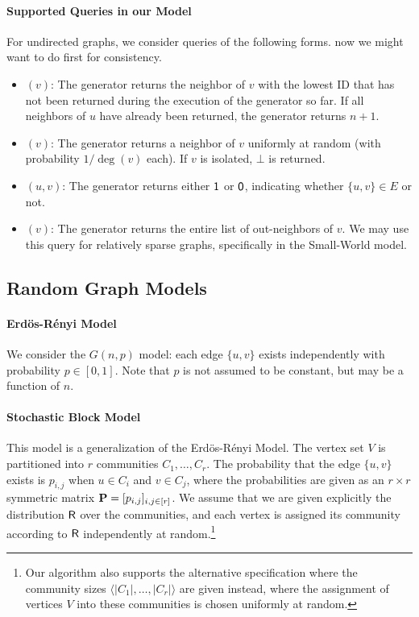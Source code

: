 \paragraph*{Supported Queries in our Model} 
For undirected graphs, we consider queries of the following forms.
now we might want to do  first for consistency.
\begin{itemize}
\item {}$(v)$: The generator returns the neighbor of $v$ with the lowest ID that has not been returned during the execution of the generator so far. If all neighbors of $u$ have already been returned, the generator returns $n+1$.
\item {}$(v)$: The generator returns a neighbor of $v$ uniformly at random (with probability $1/\deg(v)$ each). If $v$ is isolated, $\bot$ is returned.
\item {}$(u,v)$: The generator returns either $\mathsf{1}$ or $\mathsf{0}$, indicating whether $\{u,v\}\in E$ or not.
\item {}$(v)$: The generator returns the entire list of out-neighbors of $v$. We may use this query for relatively sparse graphs, specifically in the Small-World model.
\end{itemize}

\subsection{Random Graph Models}
\label{sec:graph_model}

\paragraph*{Erd\"{o}s-R\'{e}nyi Model}
We consider the $G(n, p)$ model: each edge $\{u,v\}$ exists independently with probability $p \in [0, 1]$.
Note that $p$ is not assumed to be constant, but may be a function of $n$.

\paragraph*{Stochastic Block Model}
This model is a generalization of the Erd\"{o}s-R\'{e}nyi Model. The vertex set $V$ is partitioned into $r$ communities $C_1, \ldots, C_r$. The probability that the edge $\{u,v\}$ exists is $p_{i,j}$ when $u\in C_i$ and $v\in C_j$, where the probabilities are given as an $r\times r$ symmetric matrix $\mathbf{P} = [p_{i,j}]_{i,j \in [r]}$.
We assume that we are given explicitly the distribution $\mathsf{R}$ over the communities, and
each vertex is assigned its community according to $\mathsf{R}$ independently at random.\footnote{Our algorithm also supports the alternative specification where the community sizes $\langle |C_1|, \ldots, |C_r|\rangle$ are given instead, where the assignment of vertices $V$ into these communities is chosen uniformly at random.}

